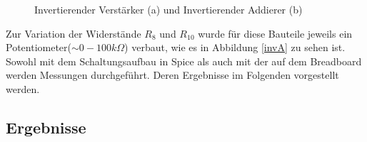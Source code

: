 \begin{figure}[h]
\centering
{}
\caption{Invertierender Verstärker (a) und Invertierender Addierer (b)}
\end{figure}

Zur Variation der Widerstände $R_{8}$ und $R_{10}$ wurde für diese Bauteile jeweils ein \newline Potentiometer($\sim 0-100k\Omega$) verbaut, wie es in Abbildung \ref{invA} zu sehen ist.
\newline Sowohl mit dem Schaltungsaufbau in Spice als auch mit der auf dem Breadboard werden Messungen durchgeführt. Deren Ergebnisse im Folgenden vorgestellt werden.

\subsection{Ergebnisse}
